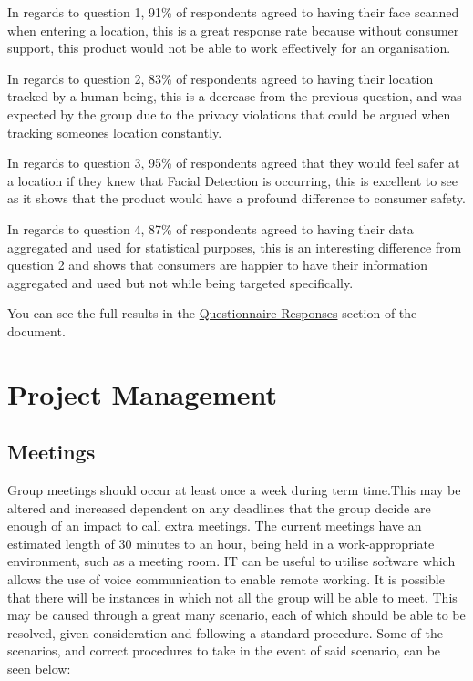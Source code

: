 \documentclass[
  english,
  a4paper,
,tablecaptionabove
]{scrartcl}
\begin{document}
In regards to question 1, 91\% of respondents agreed to having their
face scanned when entering a location, this is a great response rate
because without consumer support, this product would not be able to work
effectively for an organisation.

In regards to question 2, 83\% of respondents agreed to having their
location tracked by a human being, this is a decrease from the previous
question, and was expected by the group due to the privacy violations
that could be argued when tracking someones location constantly.

In regards to question 3, 95\% of respondents agreed that they would
feel safer at a location if they knew that Facial Detection is
occurring, this is excellent to see as it shows that the product would
have a profound difference to consumer safety.

In regards to question 4, 87\% of respondents agreed to having their
data aggregated and used for statistical purposes, this is an
interesting difference from question 2 and shows that consumers are
happier to have their information aggregated and used but not while
being targeted specifically.

You can see the full results in the
\protect\hyperlink{questionnaire-responses}{Questionnaire Responses}
section of the document.

\hypertarget{project-management}{%
\section{Project Management}\label{project-management}}

\hypertarget{meetings}{%
\subsection{Meetings}\label{meetings}}

Group meetings should occur at least once a week during term time.This
may be altered and increased dependent on any deadlines that the group
decide are enough of an impact to call extra meetings. The current
meetings have an estimated length of 30 minutes to an hour, being held
in a work-appropriate environment, such as a meeting room. IT can be
useful to utilise software which allows the use of voice communication
to enable remote working. It is possible that there will be instances in
which not all the group will be able to meet. This may be caused through
a great many scenario, each of which should be able to be resolved,
given consideration and following a standard procedure. Some of the
scenarios, and correct procedures to take in the event of said scenario,
can be seen below:
\end{document}
